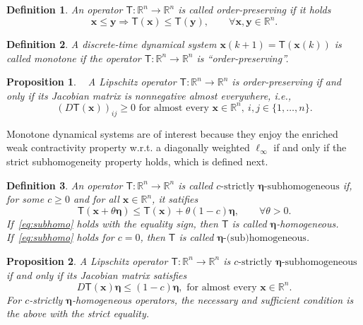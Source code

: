 \documentclass[journal,twoside,web]{ieeecolor}
\newcommand{\virg}[1]{``#1''}
\newcommand{\rea }{\mathbb{R}}
\newcommand{\xb}{\boldsymbol{x}}
\newcommand{\yb}{\boldsymbol{y}}
\newcommand{\etab}{\boldsymbol{\eta}}
\newcommand{\Ts}{\mathsf{T}}
\newtheorem{prop}{Proposition}
\newtheorem{defn}{Definition}
\begin{document}
\begin{defn}\label{def:op}
\cite[Definition 3]{Deplano20} An operator $\Ts:\mathbb{R}^n\rightarrow \mathbb{R}^n$ is called order-preserving if it holds
%
\begin{equation}\label{eq:op}
\xb\leq \yb \Rightarrow \Ts(\xb) \leq \Ts(\yb), \qquad \forall\xb,\yb \in \rea^n.
\end{equation}
\end{defn}
%
\begin{defn}\label{def:opds}\label{def:monosys}
%
\cite[Definition 1]{Deplano20} A discrete-time dynamical system ${\xb(k+1)=\Ts(\xb(k))}$ is called monotone if the operator $\Ts:\mathbb{R}^n\rightarrow \mathbb{R}^n$ is \virg{order-preserving}.
\end{defn}
%
\begin{prop}\label{prop:op}
   ~\cite[Theorem 5]{Deplano23} A Lipschitz operator ${\Ts:\rea^n\rightarrow\rea^n}$ is order-preserving if and only if its Jacobian matrix is nonnegative almost everywhere, i.e.,
    $$
    (D\Ts(\xb))_{ij}\geq 0\text{ for almost every } \xb\in\rea^n,\: i,j\in\{1,\ldots,n\}.
    $$
\end{prop}

Monotone dynamical systems are of interest because they enjoy the enriched weak contractivity property w.r.t. a diagonally weighted $\ell_\infty$ if and only if the strict subhomogeneity property holds, which is defined next.
%
\begin{defn}\label{def:subhomo}
An operator $\Ts:\mathbb{R}^n\rightarrow \mathbb{R}^n$ is called $c\text{-strictly}$ $\etab\text{-subhomogeneous}$ if, for some $c\geq 0$ and for all $\xb\in\rea^n$, it satifies
%
\begin{equation}\label{eq:subhomo}
    \Ts(\xb+\theta\etab) \leq \Ts(\xb) + \theta(1-c)\etab,\qquad \forall \theta > 0.
\end{equation}
%
If~\eqref{eq:subhomo} holds with the equality sign, then $\Ts$ is called $\etab$-homogeneous. If~\eqref{eq:subhomo} holds for $c=0$, then $\Ts$ is called $\etab\text{-(sub)homogeneous}$.
\end{defn}
%
\begin{prop}\label{prop:sh}
%
A Lipschitz operator ${\Ts:\rea^n\rightarrow\rea^n}$ is $c\text{-strictly}$ $\etab\text{-subhomogeneous}$ if and only if its Jacobian matrix satisfies
%
$$
D\Ts(\xb)\etab \leq (1-c)\etab,\text{ for almost every } \xb\in\rea^n.
$$
%
For $c$-strictly $\etab$-homogeneous operators, the necessary and sufficient condition is the above with the strict equality.
\end{prop}
\end{document}
